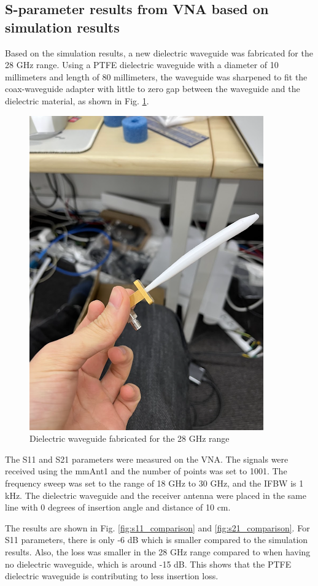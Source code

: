 \documentclass[a4paper,12pt]{report}
\begin{document}
\subsection{S-parameter results from VNA based on simulation results}

Based on the simulation results,
a new dielectric waveguide was fabricated for the 28 GHz range.
Using a PTFE dielectric waveguide with a diameter of 10 millimeters
and length of 80 millimeters,
the waveguide was sharpened to fit the coax-waveguide adapter
with little to zero gap between the waveguide and the dielectric material,
as shown in Fig. \ref{fig:waveguide_28ghz_after_sim}.

\begin{figure}
  \begin{center}
    \includegraphics[clip, keepaspectratio, width=0.5\linewidth]{img/waveguide_28ghz_after_sim.png}
    \caption{Dielectric waveguide fabricated for the 28 GHz range}
    \label{fig:waveguide_28ghz_after_sim} 
  \end{center}
\end{figure}

The S11 and S21 parameters were measured on the VNA.
The signals were received using the mmAnt1
and the number of points was set to 1001.
The frequency sweep was set to the range of 18 GHz to 30 GHz,
and the IFBW is 1 kHz.
The dielectric waveguide and the receiver antenna were placed
in the same line with 0 degrees of insertion angle
and distance of 10 cm.

The results are shown in
Fig. \ref{fig:s11_comparison} and \ref{fig:s21_comparison}.
For S11 parameters,
there is only -6 dB which is smaller compared to the simulation results.
Also, the loss was smaller in the 28 GHz range
compared to when having no dielectric waveguide,
which is around -15 dB.
This shows that the PTFE dielectric waveguide
is contributing to less insertion loss.
\end{document}
